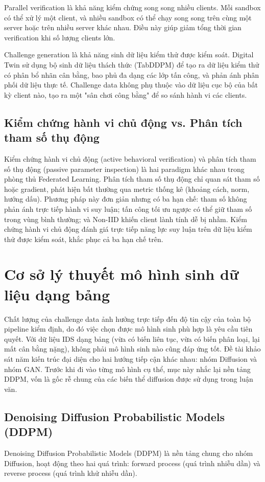 Parallel verification là khả năng kiểm chứng song song nhiều clients. Mỗi sandbox có thể xử lý một client, và nhiều sandbox có thể chạy song song trên cùng một server hoặc trên nhiều server khác nhau. Điều này giúp giảm tổng thời gian verification khi số lượng clients lớn.

Challenge generation là khả năng sinh dữ liệu kiểm thử được kiểm soát. Digital Twin sử dụng bộ sinh dữ liệu thách thức (TabDDPM) để tạo ra dữ liệu kiểm thử có phân bổ nhãn cân bằng, bao phủ đa dạng các lớp tấn công, và phản ánh phân phối dữ liệu thực tế. Challenge data không phụ thuộc vào dữ liệu cục bộ của bất kỳ client nào, tạo ra một "sân chơi công bằng" để so sánh hành vi các clients.

\subsection{Kiểm chứng hành vi chủ động vs. Phân tích tham số thụ động}
Kiểm chứng hành vi chủ động (active behavioral verification) và phân tích tham số thụ động (passive parameter inspection) là hai paradigm khác nhau trong phòng thủ Federated Learning. Phân tích tham số thụ động chỉ quan sát tham số hoặc gradient, phát hiện bất thường qua metric thống kê (khoảng cách, norm, hướng dấu). Phương pháp này đơn giản nhưng có ba hạn chế: tham số không phản ánh trực tiếp hành vi suy luận; tấn công tối ưu ngược có thể giữ tham số trong vùng bình thường; và Non-IID khiến client lành tính dễ bị nhầm. Kiểm chứng hành vi chủ động đánh giá trực tiếp năng lực suy luận trên dữ liệu kiểm thử được kiểm soát, khắc phục cả ba hạn chế trên.

\section{Cơ sở lý thuyết mô hình sinh dữ liệu dạng bảng}
Chất lượng của challenge data ảnh hưởng trực tiếp đến độ tin cậy của toàn bộ pipeline kiểm định, do đó việc chọn được mô hình sinh phù hợp là yêu cầu tiên quyết. Với dữ liệu IDS dạng bảng (vừa có biến liên tục, vừa có biến phân loại, lại mất cân bằng nặng), không phải mô hình sinh nào cũng đáp ứng tốt. Đề tài khảo sát năm kiến trúc đại diện cho hai hướng tiếp cận khác nhau: nhóm Diffusion và nhóm GAN. Trước khi đi vào từng mô hình cụ thể, mục này nhắc lại nền tảng DDPM, vốn là gốc rễ chung của các biến thể diffusion được sử dụng trong luận văn.

\subsection{Denoising Diffusion Probabilistic Models (DDPM)}
Denoising Diffusion Probabilistic Models (DDPM) là nền tảng chung cho nhóm Diffusion, hoạt động theo hai quá trình: forward process (quá trình nhiễu dần) và reverse process (quá trình khử nhiễu dần).

